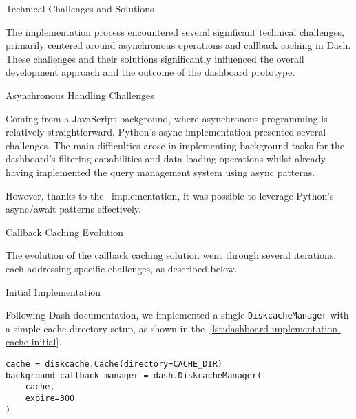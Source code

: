 \begin{section}{Technical Challenges and Solutions}
	\label{sec:implementation-technical-challenges}

	The implementation process encountered several significant technical challenges, primarily centered around asynchronous operations and callback caching in Dash.
	These challenges and their solutions significantly influenced the overall development approach and the outcome of the dashboard prototype.

	\begin{subsection}{Asynchronous Handling Challenges}
		\label{subsec:implementation-technical-challenges-async}

		Coming from a JavaScript background, where asynchronous programming is relatively straightforward\cite{node.js_asynchronous_work_javascript_asynchronous_programming_and_callbacks}, Python's async implementation presented several challenges.
		The main difficulties arose in implementing background tasks for the dashboard's filtering capabilities and data loading operations whilst already having implemented the query management system using async patterns.

		However, thanks to the~ implementation, it was possible to leverage Python's async/await patterns effectively.
	\end{subsection}

	\begin{subsection}{Callback Caching Evolution}
		\label{subsec:implementation-technical-challenges-caching}

		The evolution of the callback caching solution went through several iterations, each addressing specific challenges, as described below.

		\begin{subsubsection}{Initial Implementation}
			\label{subsubsec:implementation-technical-challenges-caching-initial}

			Following Dash documentation\cite{plotly_dash_plotly_com_background_callbacks}, we implemented a single \texttt{DiskcacheManager} with a simple cache directory setup,
			as shown in the~\autoref{lst:dashboard-implementation-cache-initial}.

			\begin{listing}[H]
				\caption{Initial Cache Manager Setup}
				\begin{verbatim}
cache = diskcache.Cache(directory=CACHE_DIR)
background_callback_manager = dash.DiskcacheManager(
    cache,
    expire=300
)
				\end{verbatim}
				\label{lst:dashboard-implementation-cache-initial}
			\end{listing}


\end{subsubsection}
\end{subsection}
\end{section}
